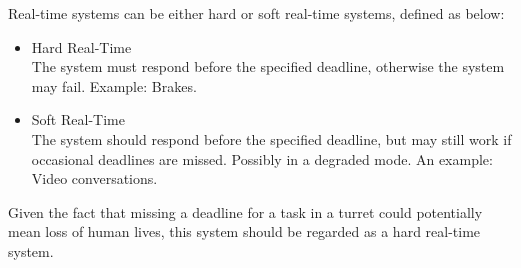 Real-time systems can be either hard or soft real-time systems, defined as below:
\begin{itemize}
\item {Hard Real-Time} \\ The system must respond before the specified deadline, otherwise the system may fail. Example: Brakes.
\item {Soft Real-Time} \\ The system should respond before the specified deadline, but may still work if occasional deadlines are missed. Possibly in a degraded mode. An example: Video conversations.
\end{itemize}\cite{realtime}

Given the fact that missing a deadline for a task in a turret could potentially mean loss of human lives, this system should be regarded as a hard real-time system.
